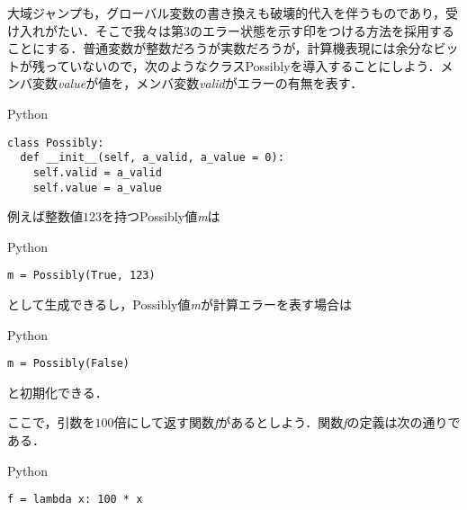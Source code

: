 \documentclass[a5paper,draft]{jsbook}
\newcommand{\programminglanguage}[1]{\textsf{#1}}
\newcommand{\python}{\programminglanguage{Python}}
\newenvironment{pythoncode}{\begin{itembox}[r]{\python}}{\end{itembox}}
\newcommand{\pthnClassname}[1]{\textrm{#1}}
\newcommand{\pthnId}[1]{\textit{#1}}
\newcommand{\pthnKeyword}[1]{\textbf{#1}}
\newcommand{\pthnOp}[1]{\texttt{#1}}
\begin{document}
大域ジャンプも，グローバル変数の書き換えも破壊的代入を伴うものであり，受け入れがたい．そこで我々は第3のエラー状態を示す印をつける方法を採用することにする．普通変数が整数だろうが実数だろうが，計算機表現には余分なビットが残っていないので，次のようなクラス\pthnClassname{Possibly}を導入することにしよう．メンバ変数\pthnId{value}が値を，メンバ変数\pthnId{valid}がエラーの有無を表す．
\begin{pythoncode}
\begin{verbatim}
class Possibly:
  def __init__(self, a_valid, a_value = 0):
    self.valid = a_valid
    self.value = a_value
\end{verbatim}
\end{pythoncode}

例えば整数値$123$を持つPossibly値\pthnId{m}は
\begin{pythoncode}
\begin{verbatim}
m = Possibly(True, 123)
\end{verbatim}
\end{pythoncode}
として生成できるし，\pthnClassname{Possibly}値\pthnId{m}が計算エラーを表す場合は
\begin{pythoncode}
\begin{verbatim}
m = Possibly(False)
\end{verbatim}
\end{pythoncode}
と初期化できる．

ここで，引数を$100$倍にして返す関数\pthnId{f}があるとしよう．関数\pthnId{f}の定義は次の通りである．
\begin{pythoncode}
\begin{verbatim}
f = lambda x: 100 * x
\end{verbatim}
\end{pythoncode}
\end{document}
